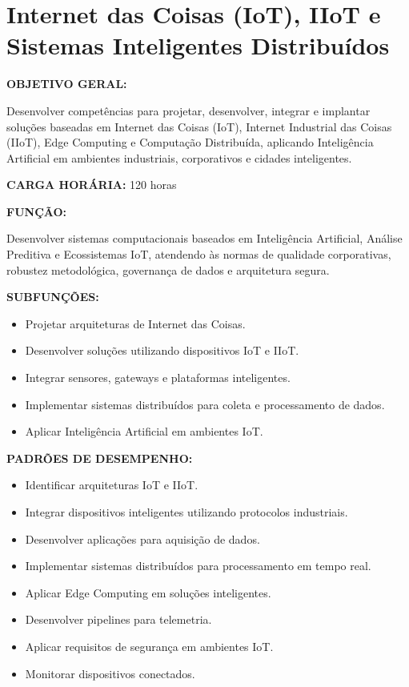 \section{Internet das Coisas (IoT), IIoT e Sistemas Inteligentes Distribuídos}

\textbf{OBJETIVO GERAL:}

Desenvolver competências para projetar, desenvolver, integrar e implantar soluções baseadas em Internet das Coisas (IoT), Internet Industrial das Coisas (IIoT), Edge Computing e Computação Distribuída, aplicando Inteligência Artificial em ambientes industriais, corporativos e cidades inteligentes.

\textbf{CARGA HORÁRIA:} 120 horas

\textbf{FUNÇÃO:}

Desenvolver sistemas computacionais baseados em Inteligência Artificial, Análise Preditiva e Ecossistemas IoT, atendendo às normas de qualidade corporativas, robustez metodológica, governança de dados e arquitetura segura.

\textbf{SUBFUNÇÕES:}

\begin{itemize}
\item Projetar arquiteturas de Internet das Coisas.
\item Desenvolver soluções utilizando dispositivos IoT e IIoT.
\item Integrar sensores, gateways e plataformas inteligentes.
\item Implementar sistemas distribuídos para coleta e processamento de dados.
\item Aplicar Inteligência Artificial em ambientes IoT.
\end{itemize}

\textbf{PADRÕES DE DESEMPENHO:}

\begin{itemize}
\item Identificar arquiteturas IoT e IIoT.
\item Integrar dispositivos inteligentes utilizando protocolos industriais.
\item Desenvolver aplicações para aquisição de dados.
\item Implementar sistemas distribuídos para processamento em tempo real.
\item Aplicar Edge Computing em soluções inteligentes.
\item Desenvolver pipelines para telemetria.
\item Aplicar requisitos de segurança em ambientes IoT.
\item Monitorar dispositivos conectados.
\end{itemize}

